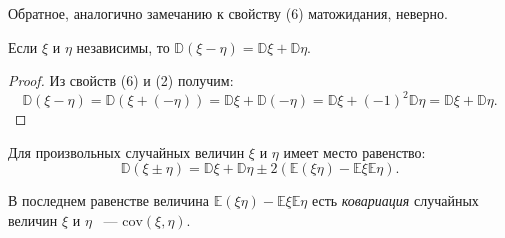 \begin{enumerate}
    \begin{rmrk}
        Обратное, аналогично замечанию к свойству (6) матожидания, неверно.
    \end{rmrk} 
    
    \begin{crlr}
        Если $\xi$ и $\eta$ независимы, то $\mathbb{D}(\xi-\eta)=\mathbb{D} \xi+\mathbb{D} \eta$. 
    \end{crlr} 
    
    \begin{proof}
    Из свойств (6) и (2) получим: 
    $$\mathbb{D}(\xi-\eta)=\mathbb{D}(\xi+(-\eta))=\mathbb{D} \xi+\mathbb{D}(-\eta)=\mathbb{D} \xi+(-1)^{2} \mathbb{D} \eta=\mathbb{D} \xi+\mathbb{D} \eta.$$
    \end{proof} 
    
    \begin{crlr}
        Для произвольных случайных величин $\xi$ и $\eta$ имеет место равенство:
    $$\mathbb{D}(\xi \pm \eta)=\mathbb{D} \xi+\mathbb{D} \eta \pm 2(\mathbb{E}(\xi \eta)-\mathbb{E} \xi \mathbb{E} \eta).$$
    \end{crlr} 
    
    \begin{rmrk}
    В последнем равенстве величина $\mathbb{E}(\xi \eta)-\mathbb{E} \xi \mathbb{E} \eta$ есть {\it ковариация} случайных величин $\xi$ и $\eta$ ~--- $\text{cov}(\xi, \eta)$.
    \end{rmrk}
    
\end{enumerate}

